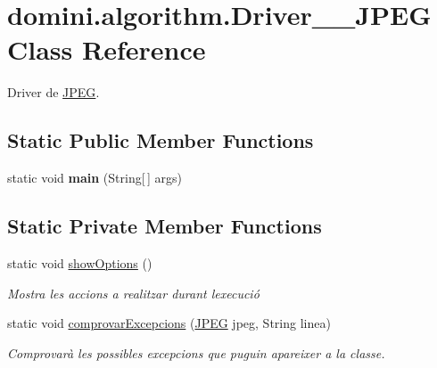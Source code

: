 \hypertarget{classdomini_1_1algorithm_1_1Driver____JPEG}{}\section{domini.\+algorithm.\+Driver\+\_\+\+\_\+\+J\+P\+EG Class Reference}
\label{classdomini_1_1algorithm_1_1Driver____JPEG}


Driver de \hyperlink{classdomini_1_1algorithm_1_1JPEG}{J\+P\+EG}.  


\subsection*{Static Public Member Functions}
\begin{DoxyCompactItemize}
\item 
\mbox{\label{classdomini_1_1algorithm_1_1Driver____JPEG_a0e1370b743ad9782e31cb6b380dd60a5}} 
static void {\bfseries main} (String\mbox{[}$\,$\mbox{]} args)
\end{DoxyCompactItemize}
\subsection*{Static Private Member Functions}
\begin{DoxyCompactItemize}
\item 
\mbox{\label{classdomini_1_1algorithm_1_1Driver____JPEG_a62ce35e061afe893bd03af9bfff41c33}} 
static void \hyperlink{classdomini_1_1algorithm_1_1Driver____JPEG_a62ce35e061afe893bd03af9bfff41c33}{show\+Options} ()
\begin{DoxyCompactList}\small\item\em Mostra les accions a realitzar durant l\textquotesingle{}execució \end{DoxyCompactList}\item 
static void \hyperlink{classdomini_1_1algorithm_1_1Driver____JPEG_ae75883665dbbf55adaa8db46f2211c75}{comprovar\+Excepcions} (\hyperlink{classdomini_1_1algorithm_1_1JPEG}{J\+P\+EG} jpeg, String linea)
\begin{DoxyCompactList}\small\item\em Comprovarà les possibles excepcions que puguin apareixer a la classe. \end{DoxyCompactList}\end{DoxyCompactItemize}


